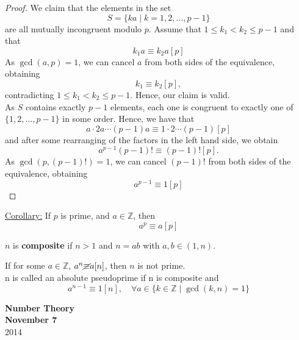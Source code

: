 \documentclass{report}
\begin{document}
\begin{proof}
We claim that the elements in the set 
\begin{equation*}
S = \{ka \mid k = 1, 2, \dots, p-1\}
\end{equation*}
are all mutually incongruent modulo $p$. Assume that $1\leq k_1 < k_2 \leq p-1$ and that
\begin{equation*}
k_1a\equiv k_2a[p]
\end{equation*}
As $\gcd(a, p) = 1$, we can cancel $a$ from both sides of the equivalence, obtaining
\begin{equation*}
k_1\equiv k_2 [p],
\end{equation*}
contradicting $1\leq k_1 < k_2 \leq p-1$. Hence, our claim is valid.\\
As $S$ contains exactly $p-1$ elements, each one is congruent to exactly one of $\{1, 2,\dots, p-1\}$ in some order. Hence, we have that
\begin{equation*}
a\cdot 2a\cdots (p-1)a \equiv 1\cdot 2\cdots (p-1)[p]
\end{equation*}
and after some rearranging of the factors in the left hand side, we obtain
\begin{equation*}
a^{p-1}(p-1)!\equiv (p-1)![p].
\end{equation*}
As $\gcd(p, (p-1)!)=1$, we can cancel $(p-1)!$ from both sides of the equivalence, obtaining
\begin{equation*}
a^{p-1}\equiv 1[p]
\end{equation*}
\end{proof}
\underline{Corollary:} If $p$ is prime, and $a \in \mathbb{Z}$, then \[ a^p \equiv a [p] \]
\begin{defi} $n$ is \textbf{composite} if $n>1$ and $n=ab$ with $a,b \in (1,n)$.
\end{defi}
\begin{defi} If for some $a \in \mathbb{Z}$, $a^n \cancel{\equiv}a [n]$, then $n$ is not prime.\\
n is called an absolute pseudoprime if n is composite and \[a^{n-1} \equiv 1[n], \quad \forall a\in \{k\in\mathbb{Z}\mid\gcd(k,n)=1 \}\]
\end{defi}
\newpage

{\centering
\Large
\textbf{Number Theory}\\
\normalsize
\textbf{November 7}\\
2014\\
}
\vspace{10mm}
\end{document}
